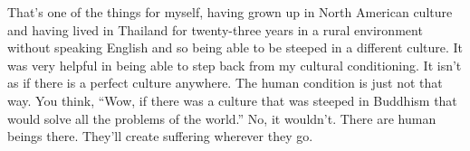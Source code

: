 That’s one of the things for myself, having grown up in North American
culture and having lived in Thailand for twenty-three years in a rural
environment without speaking English and so being able to be steeped in
a different culture. It was very helpful in being able to step back from
my cultural conditioning. It isn’t as if there is a perfect culture
anywhere. The human condition is just not that way. You think, “Wow, if
there was a culture that was steeped in Buddhism that would solve all
the problems of the world.” No, it wouldn’t. There are human beings
there. They’ll create suffering wherever they go.
